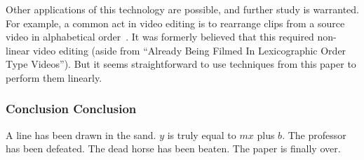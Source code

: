 \documentclass[twocolumn]{article}
\begin{document}
Other applications of this technology are possible, and further study
is warranted. For example, a common act in video editing is to
rearrange clips from a source video in alphabetical
order~\cite{murphy2014arst}. It was formerly believed that this
required non-linear video editing (aside from ``Already Being Filmed
In Lexicographic Order Type Videos''). But it seems straightforward to
use techniques from this paper to perform them linearly.

\subsubsection{Conclusion Conclusion}
A line has been drawn in the sand. $y$ is truly equal to $mx$ plus
$b$. The professor has been defeated. The dead horse has been beaten.
The paper is finally over.

{}

\end{document}
